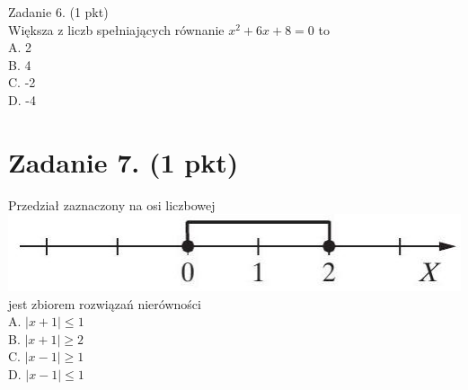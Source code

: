 \documentclass[10pt]{article}
\begin{document}
Zadanie 6. (1 pkt)\\
Większa z liczb spełniających równanie \(x^{2}+6 x+8=0\) to\\
A. 2\\
B. 4\\
C. -2\\
D. -4

\section*{Zadanie 7. (1 pkt)}
Przedział zaznaczony na osi liczbowej\\
\includegraphics[max width=\textwidth, center]{2024_11_21_3a102e13f4b06a61f46fg-02}\\
jest zbiorem rozwiązań nierówności\\
A. \(|x+1| \leqslant 1\)\\
B. \(|x+1| \geqslant 2\)\\
C. \(|x-1| \geqslant 1\)\\
D. \(|x-1| \leqslant 1\)
\end{document}
